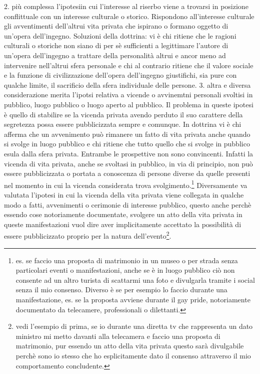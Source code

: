 

2. più complessa l'ipotesiin cui l'interesse al riserbo viene a trovarsi in posizione conflittuale con un interesse culturale o storico. Rispondono all'interesse culturale gli avventimenti dell'altrui vita privata che ispirano  o formano oggetto di un'opera dell'ingegno.
Soluzioni della dottrina: vi è chi ritiene che le ragioni culturali o storiche non siano di per sè sufficienti a legittimare l'autore di un'opera dell'ingegno a trattare della personalità altrui e ancor meno ad intervenire nell'altrui sfera personale e chi al contrario ritiene che il valore sociale e la funzione di civilizzazione dell'opera dell'ingegno giustifichi, sia pure con qualche limite, il sacrificio della sfera individuale delle persone.
3. altra e diversa considerazione merita l'ipotsi relativa a vicende o avvinemtni personali svoltisi in pubblico, luogo pubblico o luogo aperto al pubblico.
Il problema in queste ipotesi è quello di stabilire se la vicenda privata avendo perduto il suo carattere della segretezza possa essere pubblicizzata sempre e comunque.
In dottrina vi è chi afferma che un avvenimento può rimanere un fatto di vita privata anche quando si svolge in luogo pubblico e chi ritiene che tutto quello che si svolge in pubblico esula dalla sfera privata.
Entrambe le prospettive non sono convincenti.
Infatti la vicenda di vita privata, anche se svoltasi in pubblico, in via di principio, non può essere pubblicizzata o portata a conoscenza di persone diverse da quelle presenti nel momento in cui  la vicenda considerata trova svolgimento.\footnote{es. se faccio una proposta di matrimonio in un museo o per strada senza particolari eventi o manifestazioni, anche se è in luogo pubblico ciò non consente ad un altro turista di scattarmi una foto e divulgarla tramite i social senza il mio consenso. Diverso è se per esempio lo faccio durante una manifestazione, es. se la proposta avviene durante il gay pride, notoriamente documentato da telecamere, professionali o dilettanti.}
Diversamente va valutata l'ipotesi in cui la vicenda della vita privata viene collegata in qualche modo a fatti, avvenimenti o cerimonie di interesse pubblico, questo anche perchè essendo cose notoriamente documentate, svolgere un atto della vita privata in queste manifestazioni vuol dire aver implicitamente accettato la possibilità di essere pubblicizzato proprio per la natura dell'evento\footnote{vedi l'esempio di prima, se io durante una diretta tv che rappresenta un dato ministro mi metto davanti alla telecamera e faccio una proposta di matrimonio, pur essendo un atto della vita privata questo sarà divulgabile perchè sono io stesso che ho esplicitamente dato il consenso attraverso il mio comportamento concludente.}.
